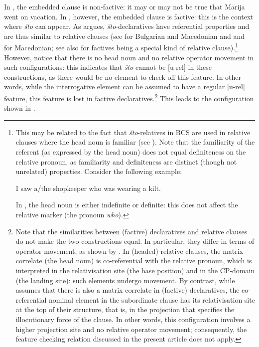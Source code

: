 \documentclass[output=paper]{langscibook}
\begin{document}
\noindent In , the embedded clause is non-factive: it may or may not be true that Marija went on vacation. In , however, the embedded clause is factive: this is the context where \textit{što} can appear. As \citet{arsenijevic2020} argues, \textit{što}-declaratives have referential properties and are thus similar to relative clauses (see \citealt[1266]{krapova2010} for Bulgarian and Macedonian and \citealt{buzarovska2009} and \citealt[69]{browne1986} for Macedonian; see also \citealt{aboh2005} for factives being a special kind of relative clause).\footnote{This may be related to the fact that \textit{što}-relatives in BCS are used in relative clauses where the head noun is familiar (see \citealt[341--342]{arsenijevic2020}). Note that the familiarity of the referent (as expressed by the head noun) does not equal definiteness on the relative pronoun, as familiarity and definiteness are distinct (though not unrelated) properties. Consider the following example:

\ea I saw a/the shopkeeper who was wearing a kilt. \label{bacsk:ex:kilt}
\z

\noindent In , the head noun is either indefinite or definite: this does not affect the relative marker (the pronoun \textit{who}).} However, notice that there is no head noun and no relative operator movement in such configurations: this indicates that \textit{što} cannot be [u-rel] in these constructions, as there would be no element to check off this feature. In other words, while the interrogative element can be assumed to have a regular [u-rel] feature, this feature is lost in factive declaratives.\footnote{Note that the similarities between (factive) declaratives and relative clauses do not make the two constructions equal. In particular, they differ in terms of operator movement, as shown by \citet{arsenijevic2009lingua}. In (headed) relative clauses, the matrix correlate (the head noun) is co-referential with the relative pronoun, which is interpreted in the relativisation site (the base position) and in the CP-domain (the landing site): such elements undergo movement. By contrast, while \citet{arsenijevic2009lingua} assumes that there is also a matrix correlate in (factive) declaratives, the co-referential nominal element in the subordinate clause has its relativisation site at the top of their structure, that is, in the projection that specifies the illocutionary force of the clause. In other words, this configuration involves a higher projection site and no relative operator movement; consequently, the feature checking relation discussed in the present article does not apply.} This leads to the configuration shown in .
\end{document}
